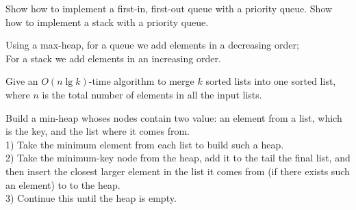 \documentclass[12pt, a4paper, UTF8]{ctexart}
\begin{document}
\begin{problem}[TC: 6.5-7]
  Show how to implement a first-in, first-out queue with a priority 
  queue. Show how to implement a stack with a priority queue.
\end{problem}

\begin{solution}
  Using a max-heap, for a queue we add elements in a decreasing order;\\
  For a stack we add elements in an increasing order.
\end{solution}

\begin{problem}[TC: 6.5-9]
  Give an $O(n\lg k)$-time algorithm to merge $k$ sorted lists into one 
  sorted list, where $n$ is the total number of elements in all the 
  input lists.
\end{problem}

\begin{solution}
  Build a min-heap whoses nodes contain two value: an element from a 
  list, which is the key, and the list where it comes from.\\
  1) Take the minimum element from each list to build such a heap.\\
  2) Take the minimum-key node from the heap, add it to the tail the 
  final list, and then insert the closest larger element in the list it 
  comes from (if there exists such an element) to to the heap.\\
  3) Continue this until the heap is empty.
\end{solution}

\end{document}
